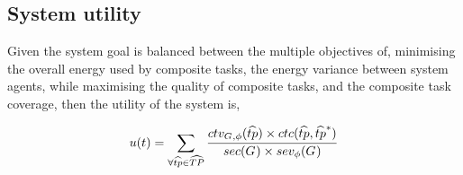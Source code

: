 \subsection{System utility}
Given the system goal is balanced between the multiple objectives of, minimising the overall energy used by composite tasks, the energy variance between system agents, while maximising the quality of composite tasks, and the composite task coverage, then the utility of the system is,

\begin{definition}
	
	\begin{equation}
		\functionSystemUtility{}{} = \sum_{\forall \varCompositeTask{}{} \in \setCompositeTask{}{}}
		\dfrac
		{
			 \functionCompositeTaskQuality{}{}
			\times
			 \functionCompositeTaskCoverage{}{}
		} 
		{
			\functionSystemEnergyConsumption{}{}
			\times
			 \functionSystemEnergyVariability{}{}
		}
	\end{equation}
\end{definition}

